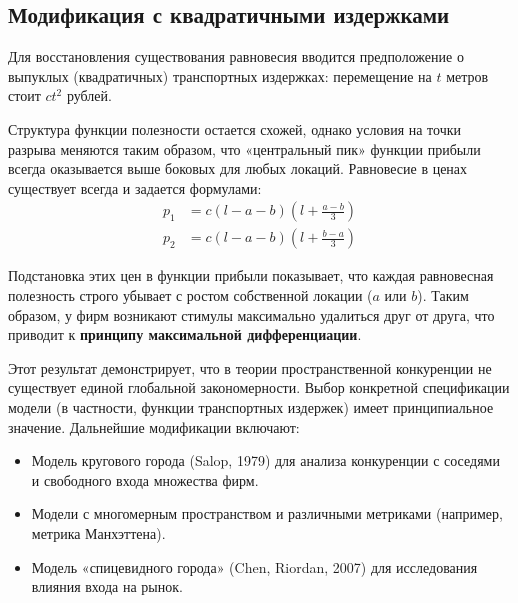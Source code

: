 \subsection{Модификация с квадратичными издержками}

Для восстановления существования равновесия вводится предположение о выпуклых (квадратичных) транспортных издержках: перемещение на $t$ метров стоит $ct^2$ рублей.

Структура функции полезности остается схожей, однако условия на точки разрыва меняются таким образом, что «центральный пик» функции прибыли всегда оказывается выше боковых для любых локаций. Равновесие в ценах существует всегда и задается формулами:
\begin{align*}
p_1 &= c (l - a - b) \left( l + \frac{a - b}{3} \right) \\
p_2 &= c (l - a - b) \left( l + \frac{b - a}{3} \right)
\end{align*}

Подстановка этих цен в функции прибыли показывает, что каждая равновесная полезность строго убывает с ростом собственной локации ($a$ или $b$). Таким образом, у фирм возникают стимулы максимально удалиться друг от друга, что приводит к \textbf{принципу максимальной дифференциации}.

Этот результат демонстрирует, что в теории пространственной конкуренции не существует единой глобальной закономерности. Выбор конкретной спецификации модели (в частности, функции транспортных издержек) имеет принципиальное значение. Дальнейшие модификации включают:
\begin{itemize}
    \item Модель кругового города (Salop, 1979) для анализа конкуренции с соседями и свободного входа множества фирм.
    \item Модели с многомерным пространством и различными метриками (например, метрика Манхэттена).
    \item Модель «спицевидного города» (Chen, Riordan, 2007) для исследования влияния входа на рынок.
\end{itemize}
